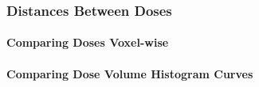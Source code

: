 \subsubsection{Distances Between Doses}
\paragraph{Comparing Doses Voxel-wise}
%

\paragraph{Comparing Dose Volume Histogram Curves}

